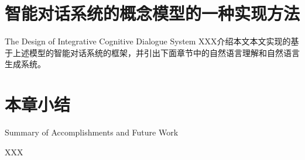 \section{智能对话系统的概念模型的一种实现方法}{The Design of Integrative Cognitive Dialogue System}
XXX介绍本文本文实现的基于上述模型的智能对话系统的框架，并引出下面章节中的自然语言理解和自然语言生成系统。


\section{本章小结}{Summary of Accomplishments and Future Work}

XXX
